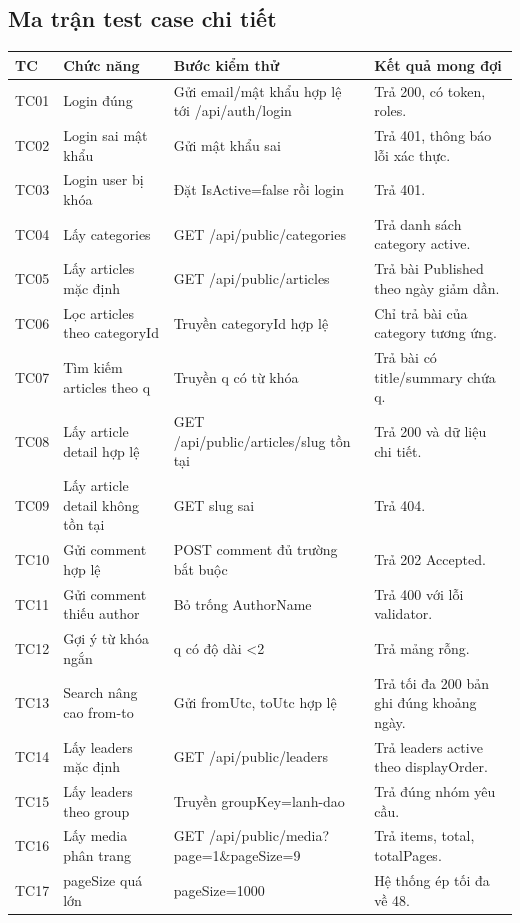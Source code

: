 \documentclass[12pt,a4paper]{article}
\begin{document}
\subsection{Ma trận test case chi tiết}
\begin{longtable}{p{1.2cm}p{3.2cm}p{4.7cm}p{4.2cm}}
\toprule
\textbf{TC} & \textbf{Chức năng} & \textbf{Bước kiểm thử} & \textbf{Kết quả mong đợi} \\
\midrule
TC01 & Login đúng & Gửi email/mật khẩu hợp lệ tới /api/auth/login & Trả 200, có token, roles. \\
TC02 & Login sai mật khẩu & Gửi mật khẩu sai & Trả 401, thông báo lỗi xác thực. \\
TC03 & Login user bị khóa & Đặt IsActive=false rồi login & Trả 401. \\
TC04 & Lấy categories & GET /api/public/categories & Trả danh sách category active. \\
TC05 & Lấy articles mặc định & GET /api/public/articles & Trả bài Published theo ngày giảm dần. \\
TC06 & Lọc articles theo categoryId & Truyền categoryId hợp lệ & Chỉ trả bài của category tương ứng. \\
TC07 & Tìm kiếm articles theo q & Truyền q có từ khóa & Trả bài có title/summary chứa q. \\
TC08 & Lấy article detail hợp lệ & GET /api/public/articles/{slug} tồn tại & Trả 200 và dữ liệu chi tiết. \\
TC09 & Lấy article detail không tồn tại & GET slug sai & Trả 404. \\
TC10 & Gửi comment hợp lệ & POST comment đủ trường bắt buộc & Trả 202 Accepted. \\
TC11 & Gửi comment thiếu author & Bỏ trống AuthorName & Trả 400 với lỗi validator. \\
TC12 & Gợi ý từ khóa ngắn & q có độ dài <2 & Trả mảng rỗng. \\
TC13 & Search nâng cao from-to & Gửi fromUtc, toUtc hợp lệ & Trả tối đa 200 bản ghi đúng khoảng ngày. \\
TC14 & Lấy leaders mặc định & GET /api/public/leaders & Trả leaders active theo displayOrder. \\
TC15 & Lấy leaders theo group & Truyền groupKey=lanh-dao & Trả đúng nhóm yêu cầu. \\
TC16 & Lấy media phân trang & GET /api/public/media?page=1\&pageSize=9 & Trả items, total, totalPages. \\
TC17 & pageSize quá lớn & pageSize=1000 & Hệ thống ép tối đa về 48. \\

\end{longtable}
\end{document}
